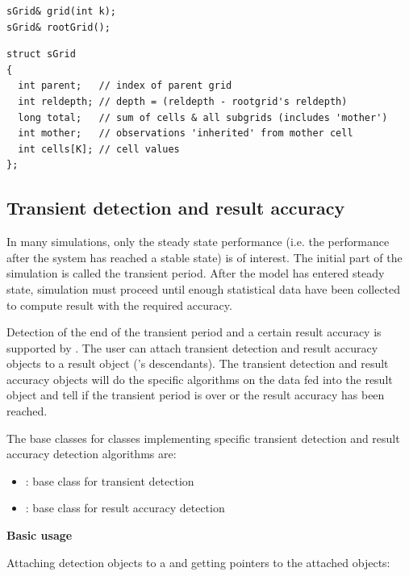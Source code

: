 \begin{verbatim}
sGrid& grid(int k);
sGrid& rootGrid();
\end{verbatim}

\begin{verbatim}
struct sGrid
{
  int parent;   // index of parent grid
  int reldepth; // depth = (reldepth - rootgrid's reldepth)
  long total;   // sum of cells & all subgrids (includes 'mother')
  int mother;   // observations 'inherited' from mother cell
  int cells[K]; // cell values
};
\end{verbatim}



\subsection{Transient detection and result accuracy}

In many simulations, only the steady state performance (i.e.
the performance after the system has reached a stable state)
is of interest. The initial part of the simulation is called
the transient period. After the model has entered steady state,
simulation must proceed until enough statistical data have been
collected to compute result with the required accuracy.


Detection of the end of the transient period and a certain result
accuracy is supported by {\opp}. The user can attach transient
detection and result accuracy objects to a result object ('s
descendants). The transient detection and result accuracy objects will
do the specific algorithms on the data fed into the result object and
tell if the transient period is over or the result accuracy has been
reached.

The base classes for classes implementing specific transient
detection and result accuracy detection algorithms are:
\begin{itemize}
\item{: base class for transient detection}
\item{: base class for result accuracy detection}
\end{itemize}


\textbf{Basic usage}

%
%

Attaching detection objects to a  and getting pointers
to the attached objects:

